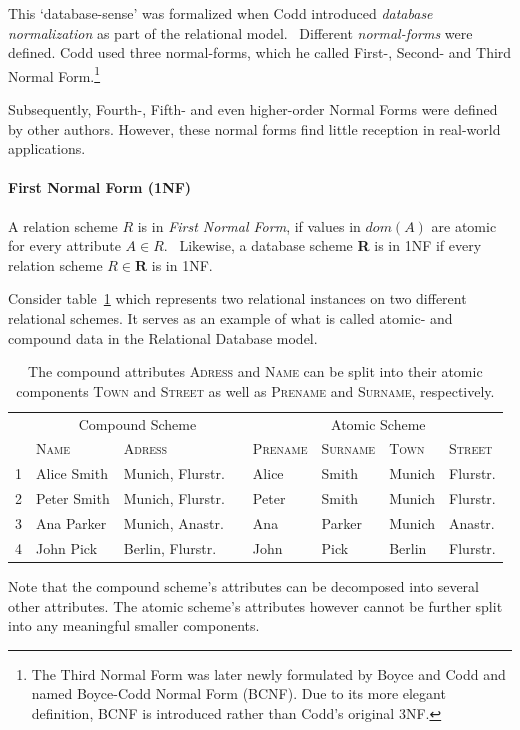 This `database-sense' was formalized when Codd introduced \emph{database normalization} as part of the relational model.~\cite[p.~381]{COD70}
Different \emph{normal-forms} were defined.
Codd used three normal-forms, which he called First-, Second- and Third Normal Form.\footnote{The Third Normal Form was later newly formulated by Boyce and Codd and named Boyce-Codd Normal Form (BCNF). Due to its more elegant definition, BCNF is introduced rather than Codd's original 3NF.}

Subsequently, Fourth-, Fifth- and even higher-order Normal Forms were defined by other authors.
However, these normal forms find little reception in real-world applications.~\cite[p.~58]{SCH17}

\paragraph{First Normal Form (1NF)} A relation scheme $R$ is in \emph{First Normal Form}, if values in \(dom(A)\) are atomic for every attribute \(A \in R\).~\cite[p.~96]{MAI83}
Likewise, a database scheme \textbf{R} is in 1NF if every relation scheme \(R \in \textbf{R} \) is in 1NF.\

Consider table~\ref{tab:first-normal-form} which represents two relational instances on two different relational schemes.
It serves as an example of what is called atomic- and compound data in the Relational Database model.~\cite[p.~6]{COD90}

\begin{table}[ht]
    \centering
    \begin{tabular}{rlllllll}\toprule
    & \multicolumn{3}{c}{Compound Scheme} & & \multicolumn{2}{c}{Atomic Scheme} \\
    \cmidrule{2-3} \cmidrule{5-8}
    & \textsc{Name} & \textsc{Adress} && \textsc{Prename} & \textsc{Surname} & \textsc{Town} & \textsc{Street}   \\ \midrule
1 & Alice Smith & Munich, Flurstr. && Alice & Smith & Munich & Flurstr. \\
2 & Peter Smith & Munich, Flurstr. && Peter & Smith & Munich & Flurstr. \\
3 & Ana Parker & Munich, Anastr. && Ana & Parker & Munich & Anastr. \\
4 & John Pick & Berlin, Flurstr. && John & Pick & Berlin & Flurstr. \\
\bottomrule
\end{tabular}
\caption{The compound attributes \textsc{Adress} and \textsc{Name} can be split into their atomic components \textsc{Town} and \textsc{Street} as well as \textsc{Prename} and \textsc{Surname}, respectively.}\label{tab:first-normal-form}
\end{table}
Note that the compound scheme's attributes can be decomposed into several other attributes.
The atomic scheme's attributes however cannot be further split into any meaningful smaller components.

